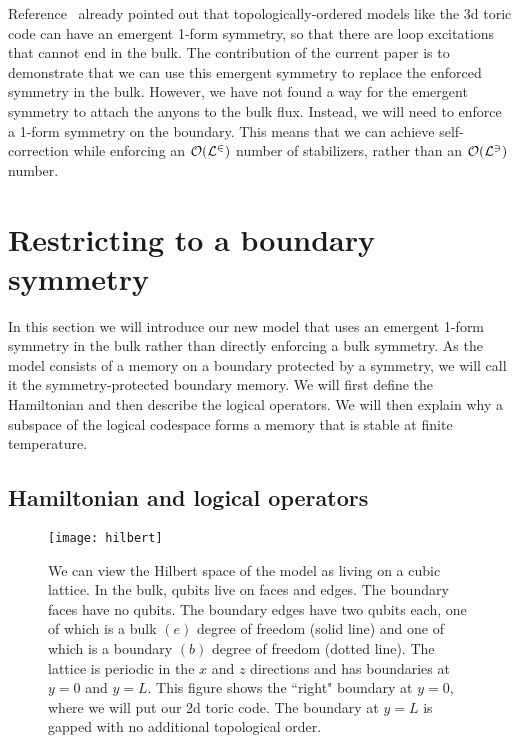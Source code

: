 Reference~\cite{RobertsBartlett2020} already pointed out that topologically-ordered models like the 3d toric code can have an emergent 1-form symmetry, so that there are loop excitations that cannot end in the bulk. 
The contribution of the current paper is to demonstrate that we can use this emergent symmetry to replace the enforced symmetry in the bulk. However, we have not found a way for the emergent symmetry to attach the anyons to the bulk flux. Instead, we will  need to enforce a 1-form symmetry on the boundary. This means that we can achieve self-correction while enforcing an $\cal{O}(L^2)$ number of stabilizers, rather than an $\cal{O}(L^3)$ number.

\section{Restricting to a boundary symmetry} \label{sec:boundary}

In this section we will introduce our new model that uses an emergent 1-form symmetry in the bulk rather than directly enforcing a bulk symmetry. As the model consists of a memory on a boundary protected by a symmetry, we will call it the symmetry-protected boundary memory. We will first define the Hamiltonian and then describe the logical operators. We will then explain why a subspace of the logical codespace forms a memory that is stable at finite temperature.

\subsection{Hamiltonian and logical operators} \label{sub:Hamiltonian}

\begin{figure}[thb!]
\centering
\texttt{[image: hilbert]}
\caption[Local Hilbert space for the model]{We can view the Hilbert space of the model as living on a cubic lattice. In the bulk, qubits live on faces and edges. The boundary faces have no qubits. The boundary edges have two qubits each, one of which is a bulk $(e)$ degree of freedom (solid line) and one of which is a boundary $(b)$ degree of freedom (dotted line). The lattice is periodic in the $x$ and $z$ directions and has boundaries at $y=0$ and $y=L$. This figure shows the ``right" boundary at $y=0$, where we will put our 2d toric code. The boundary at $y=L$ is gapped with no additional topological order.}
\label{fig:hilbert}
\end{figure}

